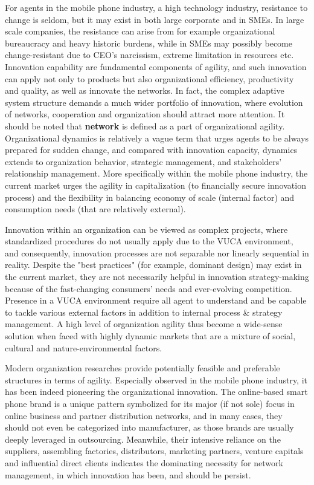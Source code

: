 \documentclass[utf8,english]{gradu3}
\begin{document}
For agents in the mobile phone industry, a high technology industry, resistance to change is seldom, but it may exist in both large corporate and in SMEs. In large scale companies, the resistance can arise from for example organizational bureaucracy and heavy historic burdens, while in SMEs may possibly become change-resistant due to CEO's narcissism, extreme limitation in resources etc. Innovation capability are fundamental components of agility, and such innovation can apply not only to products but also organizational efficiency, productivity and quality, as well as innovate the networks. In fact, the complex adaptive system structure demands a much wider portfolio of innovation, where evolution of networks, cooperation and organization should attract more attention. It should be noted that \textbf{network} is defined as a part of organizational agility. Organizational dynamics is relatively a vague term that urges agents to be always prepared for sudden change, and compared with innovation capacity, dynamics extends to organization behavior, strategic management, and stakeholders’ relationship management. More specifically within the mobile phone industry, the current market urges the agility in capitalization (to financially secure innovation process) and the flexibility in balancing economy of scale (internal factor) and consumption needs (that are relatively external).

Innovation within an organization can be viewed as complex projects, where standardized  procedures do not usually apply due to the VUCA environment, and consequently, innovation processes are not separable nor linearly sequential in reality. Despite the "best practices" (for example, dominant design) may exist in the current market, they are not necessarily helpful in innovation strategy-making because of the fast-changing consumers' needs and ever-evolving competition. Presence in a VUCA environment require all agent to understand and be capable to tackle various external factors in addition to internal process \& strategy management. A high level of organization agility thus become a wide-sense solution when faced with highly dynamic markets that are a mixture of social, cultural and nature-environmental factors.

Modern organization researches provide potentially feasible and preferable structures in terms of agility. Especially observed in the mobile phone industry, it has been indeed pioneering the organizational innovation. The online-based smart phone brand is a unique pattern symbolized for its major (if not sole) focus in online business and partner distribution networks, and in many cases, they should not even be categorized into manufacturer, as those brands are usually deeply leveraged in outsourcing. Meanwhile, their intensive reliance on the suppliers, assembling factories, distributors, marketing partners, venture capitals and influential direct clients indicates the dominating necessity for network management, in which innovation has been, and should be persist.
\end{document}
